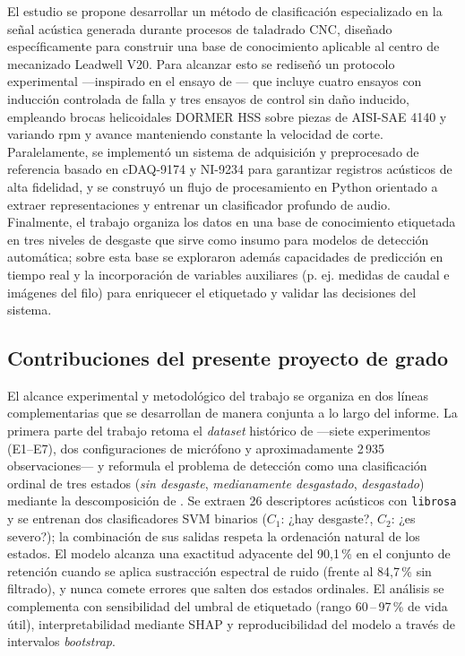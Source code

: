 \documentclass[12pt, letterpaper]{report}
\begin{document}
El estudio se propone desarrollar un método de clasificación especializado en la señal acústica generada durante procesos de taladrado CNC, diseñado específicamente para construir una base de conocimiento aplicable al centro de mecanizado Leadwell V20. Para alcanzar esto se rediseñó un protocolo experimental ---inspirado en el ensayo de --- que incluye cuatro ensayos con inducción controlada de falla y tres ensayos de control sin daño inducido, empleando brocas helicoidales DORMER HSS sobre piezas de AISI-SAE 4140 y variando rpm y avance manteniendo constante la velocidad de corte. Paralelamente, se implementó un sistema de adquisición y preprocesado de referencia basado en cDAQ-9174 y NI-9234 para garantizar registros acústicos de alta fidelidad, y se construyó un flujo de procesamiento en Python orientado a extraer representaciones y entrenar un clasificador profundo de audio. Finalmente, el trabajo organiza los datos en una base de conocimiento etiquetada en tres niveles de desgaste que sirve como insumo para modelos de detección automática; sobre esta base se exploraron además capacidades de predicción en tiempo real y la incorporación de variables auxiliares (p. ej. medidas de caudal e imágenes del filo) para enriquecer el etiquetado y validar las decisiones del sistema.

\subsection*{Contribuciones del presente proyecto de grado}

El alcance experimental y metodológico del trabajo se organiza en dos líneas complementarias que se desarrollan de manera conjunta a lo largo del informe. La primera parte del trabajo retoma el \textit{dataset} histórico de  ---siete experimentos (E1--E7), dos configuraciones de micrófono y aproximadamente 2\,935 observaciones--- y reformula el problema de detección como una clasificación ordinal de tres estados (\emph{sin desgaste}, \emph{medianamente desgastado}, \emph{desgastado}) mediante la descomposición de . Se extraen 26 descriptores acústicos con \texttt{librosa} y se entrenan dos clasificadores SVM binarios ($C_1$: ¿hay desgaste?, $C_2$: ¿es severo?); la combinación de sus salidas respeta la ordenación natural de los estados. El modelo alcanza una exactitud adyacente del 90{,}1\,\% en el conjunto de retención cuando se aplica sustracción espectral de ruido (frente al 84{,}7\,\% sin filtrado), y nunca comete errores que salten dos estados ordinales. El análisis se complementa con sensibilidad del umbral de etiquetado (rango 60\,--\,97\,\% de vida útil), interpretabilidad mediante SHAP \cite{lundberg2017} y reproducibilidad del modelo a través de intervalos \textit{bootstrap}.
\end{document}
